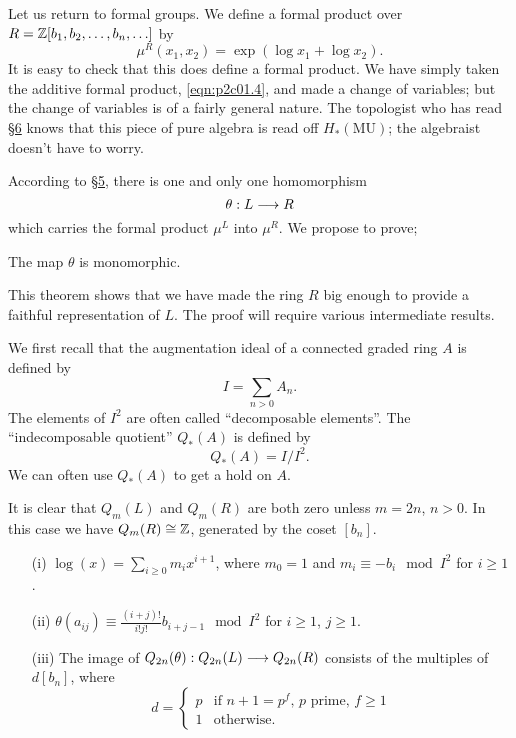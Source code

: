 \documentclass[../main]{subfiles}
\begin{document}
Let us return to formal groups. We define a formal product over $R = \mathbb{Z}[b_1, b_2, \ldots, b_n, \ldots]$ by 
\begin{equation}
\tag{7.7}
\label{eqn:p2c07.7}
\mu^R(x_1, x_2) = \exp \left(\log x_1 + \log x_2\right).
\end{equation}
It is easy to check that this does define a formal product. We have simply taken the additive formal product, \eqref{eqn:p2c01.4}, and made a change of variables; but the change of variables is of a fairly general nature. The topologist who has read \hyperref[sec:p2c6]{\S 6} knows that this piece of pure algebra is read off $H_\ast(\mathrm{MU})$; the algebraist doesn't have to worry.

According to \hyperref[sec:p2c5]{\S 5}, there is one and only one homomorphism $$\theta : L \overset{}{\longrightarrow} R$$ which carries the formal product $\mu^L$ into $\mu^R$. We propose to prove; 

\begin{theorem}
\label{thm:p2c07.8}
The map $\theta$ is monomorphic.
\end{theorem}

This theorem shows that we have made the ring $R$ big enough to provide a faithful representation of $L$. The proof will require various intermediate results. 

We first recall that the augmentation ideal of a connected graded ring $A$ is defined by $$I = \sum_{n > 0} A_n.$$ The elements of $I^2$ are often called ``decomposable elements''. The ``indecomposable quotient'' $Q_\ast(A)$ is defined by $$Q_\ast(A) = I/I^2.$$ We can often use $Q_\ast(A)$ to get a hold on $A$.

It is clear that $Q_m(L)$ and $Q_m(R)$ are both zero unless $m = 2n$, $n > 0$. In this case we have $Q_m(R) \cong \mathbb{Z}$, generated by the coset $[b_n]$. 

\begin{lemma}
\label{lem:p2c07.9}
\begin{enumerate}
    \item[(i)] $\displaystyle \log(x) = \sum_{i \ge 0} m_i x^{i + 1}$, where $m_0 = 1$ and $m_i \equiv -b_i \mod I^2$ for $i \ge 1$. 
    \item[(ii)] $\theta(a_{ij}) \equiv \tfrac {(i + j)!} {i! j!} b_{i + j - 1} \mod I^2$ for $i \ge 1$, $j \ge 1$.
    \item[(iii)] The image of $Q_{2n}(\theta) : Q_{2n}(L) \overset{}{\longrightarrow} Q_{2n}(R)$ consists of the multiples of $d[b_n]$, where $$d = \begin{cases}p & \text {if } n + 1 = p^f, \, p \text { prime}, \, f \ge 1 \\ 1 & \text{otherwise.}\end{cases}$$
\end{enumerate}
\end{lemma}
\end{document}
